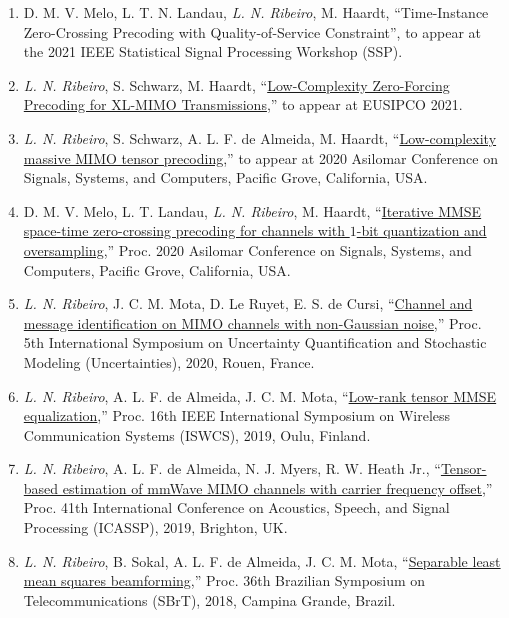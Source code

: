 \begin{enumerate}
	\item D. M. V. Melo, L. T. N. Landau, \emph{L. N. Ribeiro}, M. Haardt, ``Time-Instance Zero-Crossing Precoding with Quality-of-Service Constraint'', to appear at the 2021 IEEE Statistical Signal Processing Workshop (SSP).

	\item \emph{L. N. Ribeiro}, S. Schwarz, M. Haardt, ``\href{https://arxiv.org/abs/2103.00971}{Low-Complexity Zero-Forcing Precoding for XL-MIMO Transmissions},'' to appear at EUSIPCO 2021.

	\item \emph{L. N. Ribeiro}, S. Schwarz, A. L. F. de Almeida, M. Haardt, ``\href{https://ieeexplore.ieee.org/abstract/document/9443492}{Low-complexity massive MIMO tensor precoding},'' to appear at 2020 Asilomar Conference on Signals, Systems, and Computers, Pacific Grove, California, USA.

	\item D. M. V. Melo, L. T. Landau, \emph{L. N. Ribeiro}, M. Haardt, ``\href{https://ieeexplore.ieee.org/abstract/document/9443574}{Iterative MMSE space-time zero-crossing precoding for channels with $1$-bit quantization and oversampling},'' Proc. 2020 Asilomar Conference on Signals, Systems, and Computers, Pacific Grove, California, USA.

	\item \emph{L. N. Ribeiro}, J. C. M. Mota, D. Le Ruyet, E. S. de Cursi, ``\href{https://www5.tu-ilmenau.de/nt/generic/paper_pdfs/Ribeiro2020.pdf}{Channel and message identification on MIMO channels with non-Gaussian noise},'' Proc. 5th International Symposium on Uncertainty Quantification and Stochastic Modeling (Uncertainties), 2020, Rouen, France.
	
	\item \emph{L. N. Ribeiro}, A. L. F. de Almeida, J. C. M. Mota, ``\href{https://arxiv.org/abs/1912.08317}{Low-rank tensor MMSE equalization},'' Proc. 16th IEEE International Symposium on Wireless Communication Systems (ISWCS), 2019, Oulu, Finland.
	
	\item \emph{L. N. Ribeiro}, A. L. F. de Almeida, N. J. Myers, R. W. Heath Jr., ``\href{https://doi.org/10.1109/ICASSP.2019.8683496}{Tensor-based estimation of mmWave MIMO channels with carrier frequency offset},'' Proc. 41th International Conference on Acoustics, Speech, and Signal Processing (ICASSP), 2019, Brighton, UK.
	
	\item \emph{L. N. Ribeiro}, B. Sokal, A. L. F. de Almeida, J. C. M. Mota, ``\href{https://github.com/lnribeiro/lnribeiro.github.io/blob/master/assets/pdf/sbrt18.pdf}{Separable least mean squares beamforming},'' Proc. 36th Brazilian Symposium on Telecommunications (SBrT), 2018, Campina Grande, Brazil.
	

\end{enumerate}
